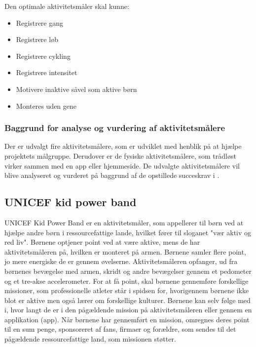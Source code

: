 Den optimale aktivitetsmåler skal kunne: 
\begin{itemize}
\item Registrere gang
\item Registrere løb
\item Registrere cykling
\item Registrere intensitet %
\item Motivere inaktive såvel som aktive børn %
\item Monteres uden gene
\end{itemize}

\subsubsection{Baggrund for analyse og vurdering af aktivitetsmålere}
Der er udvalgt fire aktivitetsmålere, som er udviklet med henblik på at hjælpe projektets målgruppe. Derudover er de fysiske aktivitetsmålere, som trådløst virker sammen med en app eller hjemmeside. 
De udvalgte aktivitetsmålere vil blive analyseret og vurderet på baggrund af de opstillede succeskrav i .


\subsection{UNICEF kid power band}
UNICEF Kid Power Band er en aktivitetsmåler, som appellerer til børn ved at hjælpe andre børn i ressourcefattige lande, hvilket fører til sloganet "vær aktiv og red liv". Børnene optjener point ved at være aktive, mens de har aktivitetsmåleren på, hvilken er monteret på armen. Børnene samler flere point, jo mere energiske de er gennem øvelserne. Aktivitetsmåleren opfanger, ud fra børnenes bevægelse med armen, skridt og andre bevægelser gennem et pedometer og et tre-akse accelerometer. \citep{PowerAbout2015,PowerManual2015} \newline 
For at få point, skal børnene gennemføre forskellige missioner, som professionelle atleter står i spidsen for, hvorigennem børnene ikke blot er aktive men også lærer om forskellige kulturer. \citep{PowerMission2015} 
Børnene kan selv følge med i, hvor langt de er i den pågældende mission på aktivitetsmåleren eller gennem en applikation (app). Når børnene har gennemført en mission, omregnes deres point til en sum penge, sponsoreret af fans, firmaer og forældre, som sendes til det pågældende ressourcefattige land, som missionen støtter. \newline

